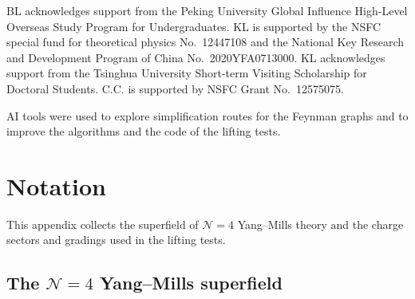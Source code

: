 \documentclass[11pt]{article}
\numberwithin{equation}{section}
\numberwithin{figure}{section}
\numberwithin{table}{section}
\begin{document}
BL acknowledges support from the Peking University Global Influence High-Level Overseas Study Program for Undergraduates. KL is supported by the NSFC special fund for theoretical physics No.~12447108 and the National Key Research and Development Program of China No.~2020YFA0713000. KL acknowledges support from the Tsinghua University Short-term Visiting Scholarship for Doctoral Students. C.C. is supported by NSFC Grant No.~12575075.

AI tools were used to explore simplification routes for the Feynman graphs and to improve the algorithms and the code of the lifting tests.

\appendix

\section{Notation}\label{sec-notation}

This appendix collects the superfield of $\mathcal N=4$ Yang--Mills theory and the charge sectors and gradings used in the lifting tests.

\subsection{The \texorpdfstring{$\mathcal N=4$}{N=4} Yang--Mills superfield}\label{sec-N4-superfield}
\end{document}
